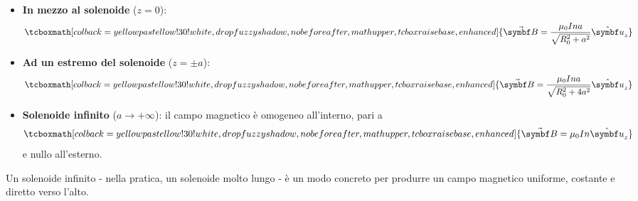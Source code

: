 		\begin{itemize}
			\item \textbf{In mezzo al solenoide} ($z=0$):
			\begin{equation}
				\tcboxmath[colback=yellowpastellow!30!white, drop fuzzy shadow, nobeforeafter, math upper, tcbox raise base, enhanced]{\vba{B}=\frac{\mu_0 I n a}{\sqrt{R_0^2+a^2}}\vbh{u}_z}
			\end{equation}
			\item \textbf{Ad un estremo del solenoide} ($z=\pm a$):
			\begin{equation}
				\tcboxmath[colback=yellowpastellow!30!white, drop fuzzy shadow, nobeforeafter, math upper, tcbox raise base, enhanced]{\vba{B}=\frac{\mu_0 I n a}{\sqrt{R_0^2+4a^2}}\vbh{u}_z}
			\end{equation}
			\item \textbf{Solenoide infinito} ($a\to+\infty$): il campo magnetico è omogeneo all'interno, pari a
			\begin{equation}
				\tcboxmath[colback=yellowpastellow!30!white, drop fuzzy shadow, nobeforeafter, math upper, tcbox raise base, enhanced]{\vba{B}=\mu_0 I n\vbh{u}_z}
			\end{equation}
			e nullo all'esterno.
		\end{itemize}
		\begin{observe}
			Un solenoide infinito - nella pratica, un solenoide molto lungo - è un modo concreto per produrre un campo magnetico uniforme, costante e diretto verso l'alto.
		\end{observe}